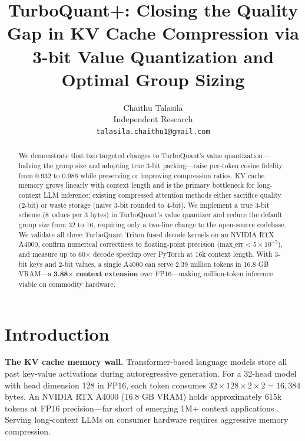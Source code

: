 \documentclass{article}
\title{TurboQuant+: Closing the Quality Gap in KV Cache Compression
       via 3-bit Value Quantization and Optimal Group Sizing}
\author{%
  Chaithu Talasila\\
  Independent Research\\
  \texttt{talasila.chaithu1@gmail.com}
}
\begin{document}
\maketitle


\begin{abstract}

We demonstrate that two targeted changes to TurboQuant's value quantization—halving the group size and adopting true 3-bit packing—raise per-token cosine fidelity from 0.932 to 0.986 while preserving or improving compression ratios.
KV cache memory grows linearly with context length and is the primary bottleneck for long-context LLM inference; existing compressed attention methods either sacrifice quality (2-bit) or waste storage (naive 3-bit rounded to 4-bit).
We implement a true 3-bit scheme (8 values per 3 bytes) in TurboQuant's value quantizer and reduce the default group size from 32 to 16, requiring only a two-line change to the open-source codebase.
We validate all three TurboQuant Triton fused decode kernels on an NVIDIA RTX A4000, confirm numerical correctness to floating-point precision ($\text{max\_err} < 5 \times 10^{-5}$), and measure up to 60$\times$ decode speedup over PyTorch at 16k context length.
With 3-bit keys and 2-bit values, a single A4000 can serve 2.39 million tokens in 16.8 GB VRAM—a \textbf{3.88$\times$ context extension} over FP16—making million-token inference viable on commodity hardware.
\end{abstract}


\section{Introduction}

\textbf{The KV cache memory wall.}
Transformer-based language models store all past key-value activations during autoregressive generation. For a 32-head model with head dimension 128 in FP16, each token consumes $32 \times 128 \times 2 \times 2 = 16{,}384$ bytes. An NVIDIA RTX A4000 (16.8 GB VRAM) holds approximately 615k tokens at FP16 precision—far short of emerging 1M+ context applications \citep{liu2024lost}. Serving long-context LLMs on consumer hardware requires aggressive memory compression.
\end{document}
